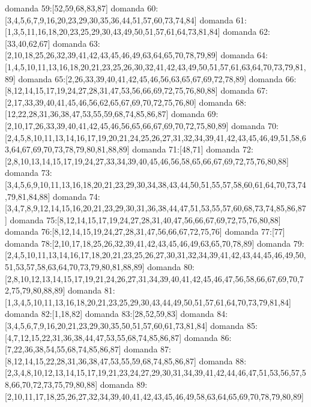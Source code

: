 domanda 59:[52,59,68,83,87]
domanda 60:[3,4,5,6,7,9,16,20,23,29,30,35,36,44,51,57,60,73,74,84]
domanda 61:[1,3,5,11,16,18,20,23,25,29,30,43,49,50,51,57,61,64,73,81,84]
domanda 62:[33,40,62,67]
domanda 63:[2,10,18,25,26,32,39,41,42,43,45,46,49,63,64,65,70,78,79,89]
domanda 64:[1,4,5,10,11,13,16,18,20,21,23,25,26,30,32,41,42,43,49,50,51,57,61,63,64,70,73,79,81,89]
domanda 65:[2,26,33,39,40,41,42,45,46,56,63,65,67,69,72,78,89]
domanda 66:[8,12,14,15,17,19,24,27,28,31,47,53,56,66,69,72,75,76,80,88]
domanda 67:[2,17,33,39,40,41,45,46,56,62,65,67,69,70,72,75,76,80]
domanda 68:[12,22,28,31,36,38,47,53,55,59,68,74,85,86,87]
domanda 69:[2,10,17,26,33,39,40,41,42,45,46,56,65,66,67,69,70,72,75,80,89]
domanda 70:[2,4,5,8,10,11,13,14,16,17,19,20,21,24,25,26,27,31,32,34,39,41,42,43,45,46,49,51,58,63,64,67,69,70,73,78,79,80,81,88,89]
domanda 71:[48,71]
domanda 72:[2,8,10,13,14,15,17,19,24,27,33,34,39,40,45,46,56,58,65,66,67,69,72,75,76,80,88]
domanda 73:[3,4,5,6,9,10,11,13,16,18,20,21,23,29,30,34,38,43,44,50,51,55,57,58,60,61,64,70,73,74,79,81,84,88]
domanda 74:[3,4,7,8,9,12,14,15,16,20,21,23,29,30,31,36,38,44,47,51,53,55,57,60,68,73,74,85,86,87]
domanda 75:[8,12,14,15,17,19,24,27,28,31,40,47,56,66,67,69,72,75,76,80,88]
domanda 76:[8,12,14,15,19,24,27,28,31,47,56,66,67,72,75,76]
domanda 77:[77]
domanda 78:[2,10,17,18,25,26,32,39,41,42,43,45,46,49,63,65,70,78,89]
domanda 79:[2,4,5,10,11,13,14,16,17,18,20,21,23,25,26,27,30,31,32,34,39,41,42,43,44,45,46,49,50,51,53,57,58,63,64,70,73,79,80,81,88,89]
domanda 80:[2,8,10,12,13,14,15,17,19,21,24,26,27,31,34,39,40,41,42,45,46,47,56,58,66,67,69,70,72,75,79,80,88,89]
domanda 81:[1,3,4,5,10,11,13,16,18,20,21,23,25,29,30,43,44,49,50,51,57,61,64,70,73,79,81,84]
domanda 82:[1,18,82]
domanda 83:[28,52,59,83]
domanda 84:[3,4,5,6,7,9,16,20,21,23,29,30,35,50,51,57,60,61,73,81,84]
domanda 85:[4,7,12,15,22,31,36,38,44,47,53,55,68,74,85,86,87]
domanda 86:[7,22,36,38,54,55,68,74,85,86,87]
domanda 87:[8,12,14,15,22,28,31,36,38,47,53,55,59,68,74,85,86,87]
domanda 88:[2,3,4,8,10,12,13,14,15,17,19,21,23,24,27,29,30,31,34,39,41,42,44,46,47,51,53,56,57,58,66,70,72,73,75,79,80,88]
domanda 89:[2,10,11,17,18,25,26,27,32,34,39,40,41,42,43,45,46,49,58,63,64,65,69,70,78,79,80,89]


